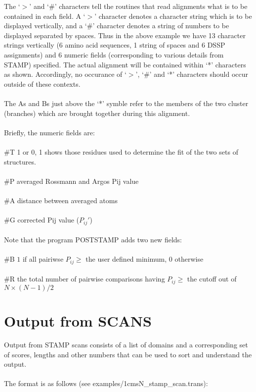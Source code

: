 The `$>$' and `\#' characters tell the routines that read alignments
what is to be contained in each field.  A `$>$' character denotes a
character string which is to be displayed vertically, and a `\#'
character denotes a string of numbers to be displayed separated by
spaces.  Thus in the above example we have 13 character strings
vertically (6 amino acid sequences, 1 string of spaces and 6 DSSP
assignments) and 6 numeric fields (corresponding to various details
from STAMP) specified.  The actual alignment will be contained
within `*' characters as shown.  Accordingly, no occurance of `$>$',
`\#' and `*' characters should occur outside of these contexts.\\
\\
The As and Bs just above the `*' symble 
refer to the members of the two cluster (branches) 
which are brought together during this alignment.\\
\\
Briefly, the numeric fields are:\\
\\
\#T  1 or 0, 1 shows those residues used to 
         determine the fit of the two sets of structures.\\
\\
\#P  averaged Rossmann and Argos Pij value\\
\\
\#A  distance between averaged \Cal atoms\\
\\
\#G  corrected Pij value ($P_{ij}{\prime}$)\\
\\
Note that the program POSTSTAMP adds two new fields:\\
\\
\#B  $1$ if all pairiwse $P_{ij} \geq$  the user defined minimum, $0$ otherwise\\
\\
\#R  the total number of pairwise comparisons having $P_{ij} \geq $ the cutoff out of $N\times(N-1)/2$

\section{Output from SCANS}

Output from STAMP scans consists of a list of domains and a 
corresponding set of scores, lengths and other numbers that can be 
used to sort and understand the output.\\
\\
The format is as follows (see examples/1cmsN\_stamp\_scan.trans):\\

